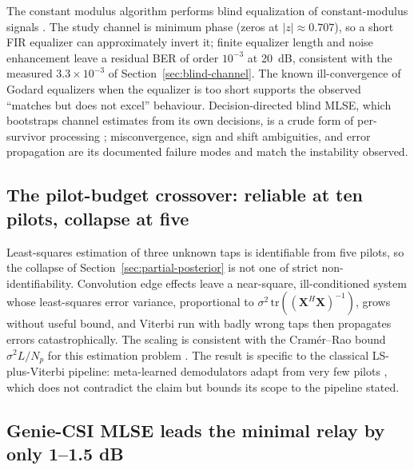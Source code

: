 The constant modulus algorithm performs blind equalization of constant-modulus signals \cite{Godard1980SelfRecovering, TreichlerAgee1983CMA}. The study channel is minimum phase (zeros at $|z| \approx 0.707$), so a short FIR equalizer can approximately invert it; finite equalizer length and noise enhancement leave a residual BER of order $10^{-3}$ at 20~dB, consistent with the measured $3.3\times10^{-3}$ of Section~\ref{sec:blind-channel}. The known ill-convergence of Godard equalizers when the equalizer is too short \cite{Ding1991IllConvergence} supports the observed ``matches but does not excel'' behaviour. Decision-directed blind MLSE, which bootstraps channel estimates from its own decisions, is a crude form of per-survivor processing \cite{RaheliPolydorosTzou1995PSP}; misconvergence, sign and shift ambiguities, and error propagation are its documented failure modes and match the instability observed.

\subsection{The pilot-budget crossover: reliable at ten pilots, collapse at five}

Least-squares estimation of three unknown taps is identifiable from five pilots, so the collapse of Section~\ref{sec:partial-posterior} is not one of strict non-identifiability. Convolution edge effects leave a near-square, ill-conditioned system whose least-squares error variance, proportional to $\sigma^{2}\,\mathrm{tr}\!\left((\mathbf{X}^{H}\mathbf{X})^{-1}\right)$, grows without useful bound, and Viterbi run with badly wrong taps then propagates errors catastrophically. The scaling is consistent with the Cram\'er--Rao bound $\sigma^{2}L/N_{p}$ for this estimation problem \cite{Kay1993Estimation}. The result is specific to the classical LS-plus-Viterbi pipeline: meta-learned demodulators adapt from very few pilots \cite{ParkSimeone2021MetaDemod}, which does not contradict the claim but bounds its scope to the pipeline stated.

\subsection{Genie-CSI MLSE leads the minimal relay by only 1--1.5 dB}

